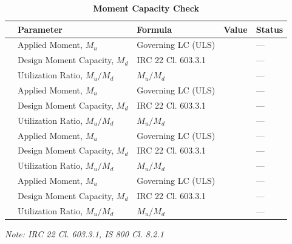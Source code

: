 \documentclass[12pt,a4paper]{report}
\numberwithin{table}{chapter}
\numberwithin{figure}{chapter}
\begin{document}
\vspace{1em}
\begin{longtable}{|C{2.5cm}|C{3.5cm}|C{3.5cm}|>{\centering\arraybackslash}p{4.2cm}|C{1.8cm}|}
\caption{\textbf{Moment Capacity Check}}
\hline
\textbf{} & \textbf{Parameter} & \textbf{Formula} & \textbf{Value} & \textbf{Status} \\[6pt]
\hline
{} & Applied Moment, $M_u$ & Governing LC (ULS) &  & --- \\[6pt]
 & Design Moment Capacity, $M_d$ & IRC 22 Cl. 603.3.1 &  & --- \\[6pt]
 & Utilization Ratio, $M_u / M_d$ & $M_u / M_d$ &  & --- \\[6pt]
\hline
{} & Applied Moment, $M_u$ & Governing LC (ULS) &  & --- \\[6pt]
 & Design Moment Capacity, $M_d$ & IRC 22 Cl. 603.3.1 &  & --- \\[6pt]
 & Utilization Ratio, $M_u / M_d$ & $M_u / M_d$ &  & --- \\[6pt]
\hline
{} & Applied Moment, $M_u$ & Governing LC (ULS) &  & --- \\[6pt]
 & Design Moment Capacity, $M_d$ & IRC 22 Cl. 603.3.1 &  & --- \\[6pt]
 & Utilization Ratio, $M_u / M_d$ & $M_u / M_d$ &  & --- \\[6pt]
\hline
{} & Applied Moment, $M_u$ & Governing LC (ULS) &  & --- \\[6pt]
 & Design Moment Capacity, $M_d$ & IRC 22 Cl. 603.3.1 &  & --- \\[6pt]
 & Utilization Ratio, $M_u / M_d$ & $M_u / M_d$ &  & --- \\[6pt]
\hline
\end{longtable}
\noindent\textit{Note: IRC 22 Cl. 603.3.1, IS 800 Cl. 8.2.1}
\end{document}
